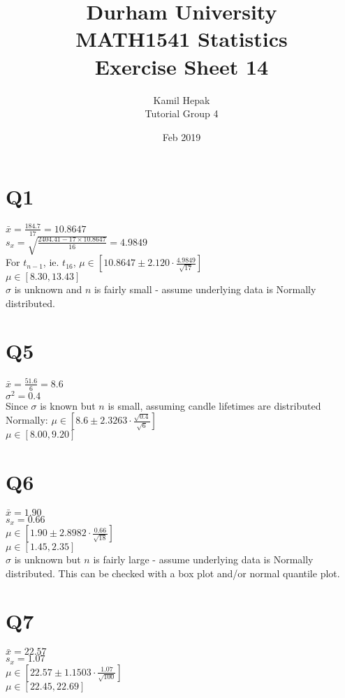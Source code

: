 \documentclass[]{article}
\title{\vspace{-3cm}Durham University\\
    MATH1541 Statistics \\
	Exercise Sheet 14}
\author{Kamil Hepak\\
        Tutorial Group 4}
\date{Feb 2019}
\begin{document}
\maketitle
\section{Q1}
$\bar{x} = \frac{184.7}{17} = 10.8647$
\\
$s_x = \sqrt{\frac{2404.41-17\times 10.8647}{16}} = 4.9849$
\\
For $t_{n-1}$, ie. $t_{16}$, $\mu \in [10.8647 \pm 2.120\cdot\frac{4.9849}{\sqrt{17}}]$
\\
$\mu \in [8.30, 13.43]$
\\
$\sigma$ is unknown and $n$ is fairly small - assume underlying data is Normally distributed.

\section{Q5}
$\bar{x} = \frac{51.6}{6} = 8.6$
\\
$\sigma^2 = 0.4$
\\
Since $\sigma$ is known but $n$ is small, assuming candle lifetimes are distributed Normally: $\mu \in [8.6 \pm 2.3263\cdot\frac{\sqrt{0.4}}{\sqrt{6}}]$
\\
$\mu \in [8.00, 9.20]$

\section{Q6}
$\bar{x} = 1.90$
\\
$s_x = 0.66$
\\
$\mu \in [1.90 \pm 2.8982\cdot\frac{0.66}{\sqrt{18}}]$
\\
$\mu \in [1.45, 2.35]$
\\
$\sigma$ is unknown but $n$ is fairly large - assume underlying data is Normally distributed. This can be checked with a box plot and/or normal quantile plot.

\section{Q7}
$\bar{x} = 22.57$
\\
$s_x = 1.07$
\\
$\mu \in [22.57 \pm 1.1503\cdot\frac{1.07}{\sqrt{100}}]$
\\
$\mu \in [22.45, 22.69]$
\end{document}
